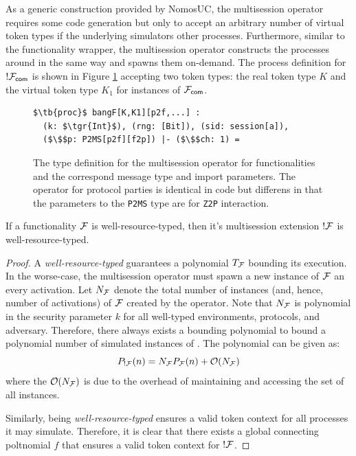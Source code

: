 As a generic construction provided by NomosUC, the multisession operator requires some code generation but only to accept an arbitrary number of virtual token types if the underlying \F simulators other processes. 
Furthermore, similar to the functionality wrapper, the multisession operator constructs the processes around \F in the same way and spawns them on-demand.
The process definition for $!\mathcal{F}_{{\mathsf {com}}}$ is shown in Figure \ref{lst:bangf} accepting two token types: the real token type $K$ and the virtual token type $K_1$ for instances of $\mathcal{F}_{{\mathsf {com}}}$.

\begin{figure}
\begin{lstlisting}[basicstyle=\small\BeraMonottFamily, frame=single, mathescape]
$\tb{proc}$ bangF[K,K1][p2f,...] :
  (k: $\tgr{Int}$), (rng: [Bit]), (sid: session[a]), 
  ($\$$p: P2MS[p2f][f2p]) |- ($\$$ch: 1) =
\end{lstlisting}
\caption{The type definition for the multisession operator for functionalities and the correspond message type and import parameters. The operator for protocol parties is identical in code but differens in that the parameters to the \texttt{P2MS} type are for \texttt{Z2P} interaction.}
\label{lst:bangf}
\end{figure}

\begin{theorem}[PPT !]\label{thm:bangppt}
If a functionality $\mathcal{F}$ is well-resource-typed, then it's multisession extension $!\mathcal{F}$ is well-resource-typed.
\end{theorem}

\begin{proof}
A \textit{well-resource-typed} \F guarantees a polynomial $T_{\mathcal{F}}$ bounding its execution.
In the worse-case, the multisession operator must spawn a new instance of $\mathcal{F}$ an every activation. 
Let $N_{\mathcal{F}}$ denote the total number of instances (and, hence, number of activations) of $\mathcal{F}$ created by the operator.
Note that $N_{\mathcal{F}}$ is polynomial in the security parameter $k$ for all well-typed environments, protocols, and adversary.
Therefore, there always exists a bounding polynomial to bound a polynomial number of simulated instances of \F.
The polynomial can be given as:
$$ P_{!\mathcal{F}}(n) = N_{\mathcal{F}} P_{\mathcal{F}}(n) + \mathcal{O}(N_{\mathcal{F}}) $$
where the $\mathcal{O}(N_{\mathcal{F}})$ is due to the overhead of maintaining and accessing the set of all instances.

Similarly, \F being \textit{well-resource-typed} ensures a valid token context for all processes it may simulate. 
Therefore, it is clear that there exists a global connecting poltnomial $f$ that ensures a valid token context for $!\mathcal{F}$.
\end{proof}

